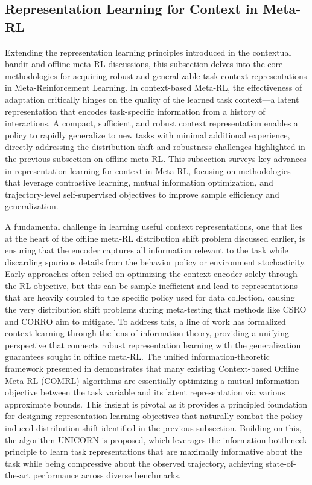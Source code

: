 \documentclass[11pt]{article}
\begin{document}
\subsection{Representation Learning for Context in Meta-RL}

Extending the representation learning principles introduced in the contextual bandit and offline meta-RL discussions, this subsection delves into the core methodologies for acquiring robust and generalizable task context representations in Meta-Reinforcement Learning. In context-based Meta-RL, the effectiveness of adaptation critically hinges on the quality of the learned task context---a latent representation that encodes task-specific information from a history of interactions. A compact, sufficient, and robust context representation enables a policy to rapidly generalize to new tasks with minimal additional experience, directly addressing the distribution shift and robustness challenges highlighted in the previous subsection on offline meta-RL. This subsection surveys key advances in representation learning for context in Meta-RL, focusing on methodologies that leverage contrastive learning, mutual information optimization, and trajectory-level self-supervised objectives to improve sample efficiency and generalization.

A fundamental challenge in learning useful context representations, one that lies at the heart of the offline meta-RL distribution shift problem discussed earlier, is ensuring that the encoder captures all information relevant to the task while discarding spurious details from the behavior policy or environment stochasticity. Early approaches often relied on optimizing the context encoder solely through the RL objective, but this can be sample-inefficient and lead to representations that are heavily coupled to the specific policy used for data collection, causing the very distribution shift problems during meta-testing that methods like CSRO and CORRO aim to mitigate. To address this, a line of work has formalized context learning through the lens of information theory, providing a unifying perspective that connects robust representation learning with the generalization guarantees sought in offline meta-RL. The unified information-theoretic framework presented in \cite{ref344} demonstrates that many existing Context-based Offline Meta-RL (COMRL) algorithms are essentially optimizing a mutual information objective between the task variable and its latent representation via various approximate bounds. This insight is pivotal as it provides a principled foundation for designing representation learning objectives that naturally combat the policy-induced distribution shift identified in the previous subsection. Building on this, the algorithm UNICORN is proposed, which leverages the information bottleneck principle to learn task representations that are maximally informative about the task while being compressive about the observed trajectory, achieving state-of-the-art performance across diverse benchmarks.
\end{document}
